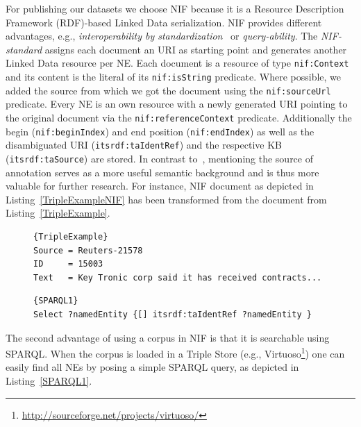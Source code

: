 \documentclass[10pt, a4paper]{article}
\begin{document}
For publishing our datasets we choose NIF because it is a Resource Description Framework (RDF)-based Linked Data serialization.
NIF provides different advantages, e.g., \emph{interoperability by standardization}~\cite{ISWC2013NIF} or \emph{query-ability}.
The \emph{NIF-standard} assigns each document an URI as starting point and generates another Linked Data resource per NE.
Each document is a resource of type \texttt{nif:Context} and its content is the literal of its \texttt{nif:isString} predicate. 
Where possible, we added the source from which we got the document using the \texttt{nif:sourceUrl} predicate.
Every NE is an own resource with a newly generated URI pointing to the original document via the \texttt{nif:referenceContext} predicate.
Additionally the begin (\texttt{nif:beginIndex}) and end position (\texttt{nif:endIndex}) as well as the disambiguated URI (\texttt{itsrdf:taIdentRef}) and the respective KB (\texttt{itsrdf:taSource}) are stored.
In contrast to~\cite{NEDstatBench}, mentioning the source of annotation serves as a more useful semantic background and is thus more valuable for further research.
For instance, NIF document as depicted in Listing~\ref{TripleExampleNIF} has been transformed from the document from Listing~\ref{TripleExample}.

\begin{figure}[tb]
\begin{lstlisting}[label=TripleExample,caption=example input text.]{TripleExample}
Source = Reuters-21578
ID     = 15003
Text   = Key Tronic corp said it has received contracts...
\end{lstlisting}
\end{figure}

\begin{figure}[tb]
\begin{lstlisting}[label=SPARQL1,caption=SPARQL query to get all NEs.]{SPARQL1}
Select ?namedEntity {[] itsrdf:taIdentRef ?namedEntity }
\end{lstlisting}
\end{figure}


The second advantage of using a corpus in NIF is that it is searchable using SPARQL.
When the corpus is loaded in a Triple Store (e.g., Virtuoso\footnote{\url{http://sourceforge.net/projects/virtuoso/}}) one can easily find all NEs by posing a simple SPARQL query, as depicted in Listing~\ref{SPARQL1}.
\end{document}
